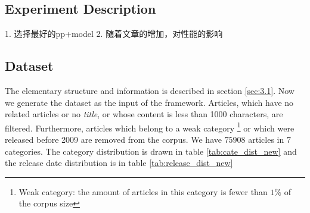 \subsection{Experiment Description}
\label{sec:4.4}

1. 选择最好的pp+model 
2. 随着文章的增加，对性能的影响

\subsection{Dataset}

The elementary structure and information is described in section \ref{sec:3.1}. Now we generate the dataset as the input of the framework. Articles, which have no related articles or no \textit{title}, or whose content is less than 1000 characters, are filtered. Furthermore, articles which belong to a weak category \footnote{Weak category: the amount of articles in this category is fewer than $1\%$ of the corpus size} or which were released before 2009 are removed from the corpus. We have $75908$ articles in $7$ categories. The category distribution is drawn in table \ref{tab:cate_dist_new} and the release date distribution is in table \ref{tab:release_dist_new}

